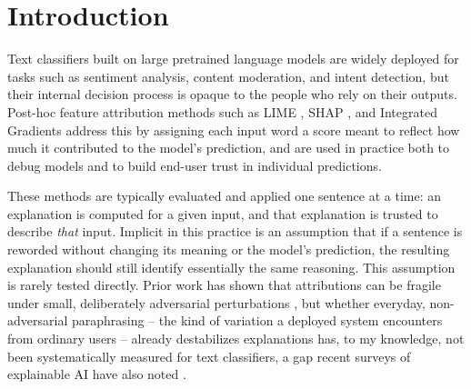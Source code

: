 %

\section{Introduction}
\label{sec:introduction}

Text classifiers built on large pretrained language models are widely
deployed for tasks such as sentiment analysis, content moderation, and
intent detection, but their internal decision process is opaque to the
people who rely on their outputs. Post-hoc feature attribution methods
such as LIME \citep{ribeiro2016why}, SHAP \citep{lundberg2017unified},
and Integrated Gradients \citep{sundararajan2017axiomatic} address this
by assigning each input word a score meant to reflect how much it
contributed to the model's prediction, and are used in practice both to
debug models and to build end-user trust in individual predictions.

These methods are typically evaluated and applied one sentence at a
time: an explanation is computed for a given input, and that explanation
is trusted to describe \emph{that} input. Implicit in this practice is
an assumption that if a sentence is reworded without changing its
meaning or the model's prediction, the resulting explanation should
still identify essentially the same reasoning. This assumption is
rarely tested directly. Prior work has shown that attributions can be
fragile under small, deliberately adversarial perturbations
\citep{ghorbani2019interpretation,adebayo2018sanity,slack2020fooling,ivankay2022fooling,ivankay2022estimating},
but whether everyday, non-adversarial paraphrasing -- the kind of
variation a deployed system encounters from ordinary users -- already
destabilizes explanations has, to my knowledge, not been systematically
measured for text classifiers, a gap recent surveys of explainable AI
have also noted \citep{palikhe2025towards}.

